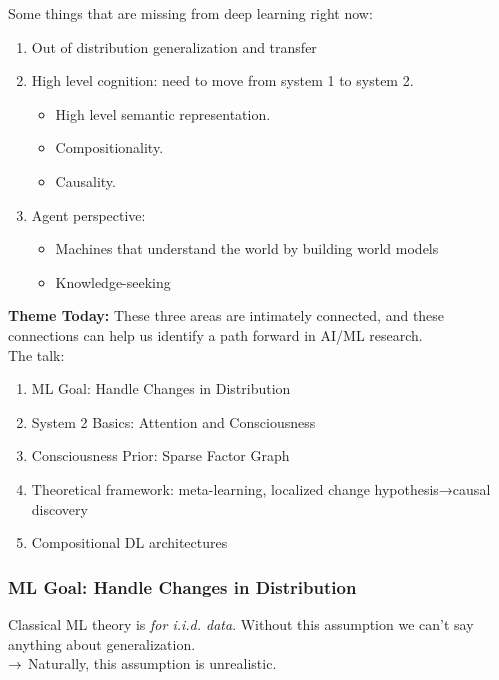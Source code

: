 Some things that are missing from deep learning right now:
\begin{enumerate}
    \item Out of distribution generalization and transfer
    \item High level cognition: need to move from system 1 to system 2.
    \begin{itemize}
        \item High level semantic representation.
        \item Compositionality.
        \item Causality.
    \end{itemize}
    \item Agent perspective:
    \begin{itemize}
        \item Machines that understand the world by building world models
        \item Knowledge-seeking
    \end{itemize}
\end{enumerate}

{\bf Theme Today:} These three areas are intimately connected, and these connections can help us identify a path forward in AI/ML research. \\

The talk:
\begin{enumerate}
    \item ML Goal: Handle Changes in Distribution
    \item System 2 Basics:  Attention and Consciousness
    \item Consciousness Prior:  Sparse Factor Graph
    \item Theoretical  framework:  meta-learning,  localized  change hypothesis→causal discovery
    \item  Compositional DL architectures
\end{enumerate}

\spacerule
\subsubsection{ML Goal: Handle Changes in Distribution}

Classical ML theory is {\it for i.i.d. data}. Without this assumption we can't say anything about generalization. \\

$\rightarrow$ Naturally, this assumption is unrealistic. \\

